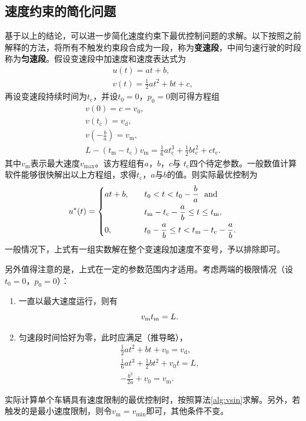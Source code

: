 \subsection{速度约束的简化问题}
基于以上的结论，可以进一步简化速度约束下最优控制问题的求解。以下按照之前解释的方法，将所有不触发约束段合成为一段，称为\textbf{变速段}，中间匀速行驶的时段称为\textbf{匀速段}。假设变速段中加速度和速度表达式为
\begin{gather}
u(t)=at+b,\\
v(t)=\frac12at^2+bt+c,
\end{gather}
再设变速段持续时间为$t_\mathrm{c}$，并设$t_0=0$，$p_0=0$则可得方程组
\begin{gather}
v(0)=c=v_0,\label{eq:vopt:1}\\
v(t_\mathrm{c})=v_\mathrm{d},\\
v(-\frac ba)=v_\mathrm{m},\\
L-(t_\mathrm{m}-t_\mathrm{c})v_\mathrm{m}=\frac16at_\mathrm{c}^3+\frac12bt_\mathrm{c}^2+ct_\mathrm{c}.\label{eq:vopt:4}
\end{gather}
其中$v_\mathrm{m}$表示最大速度$v_{\max}$。该方程组有$a$，$b$，$c$与 $t_\mathrm{c}$四个待定参数。一般数值计算软件能够很快解出以上方程组，求得$t_\mathrm{c}$，$a$与$b$的值。则实际最优控制为
\begin{equation}
u^*(t)=
\begin{dcases}
at+b,\quad & t_0<t<t_0-\frac ba\ \text{ and}\\
\quad & t_\mathrm{m}-t_\mathrm{c}-\frac ab\leq t\leq t_\mathrm{m},\\
0,\quad & t_0-\frac ab \leq t < t_\mathrm{m}-t_\mathrm{c}-\frac ab.
\end{dcases}
\end{equation}
一般情况下，上式有一组实数解在整个变速段加速度不变号，予以排除即可。

另外值得注意的是，上式在一定的参数范围内才适用。考虑两端的极限情况（设$t_0=0$，$p_0=0$）：
\begin{enumerate}[label=(\arabic*), wide=\parindent]
\item 一直以最大速度运行，则有
\begin{equation}
v_\mathrm{m}t_\mathrm{m}=L.\\
\end{equation}
\item 匀速段时间恰好为零，此时应满足（推导略），
\begin{gather}
\frac12at^2+bt+v_0=v_\mathrm{d},\\
\frac16at^3+\frac12bt^2+v_0t=L,\\
-\frac{b^2}{2a}+v_0=v_\mathrm{m}.
\end{gather}
\end{enumerate}
实际计算单个车辆具有速度限制的最优控制时，按照算法\eqref{alg:vsin}求解。另外，若触发的是最小速度限制，则令$v_\mathrm{m}=v_{\min}$即可，其他条件不变。

